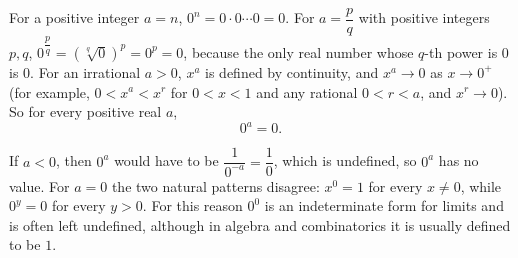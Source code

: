 For a positive integer $a=n$, $0^n=0\cdot0\cdots0=0$. For $a=\dfrac pq$ with positive integers $p,q$, $0^{\dfrac pq}=\left(\sqrt[q]{0}\right)^p=0^p=0$, because the only real number whose $q$-th power is $0$ is $0$. For an irrational $a>0$, $x^a$ is defined by continuity, and $x^a\to0$ as $x\to0^+$ (for example, $0<x^a<x^{r}$ for $0<x<1$ and any rational $0<r<a$, and $x^r\to0$). So for every positive real $a$,
\[0^a=\boxed{0}.\]

If $a<0$, then $0^a$ would have to be $\dfrac{1}{0^{-a}}=\dfrac10$, which is undefined, so $0^a$ has no value. For $a=0$ the two natural patterns disagree: $x^0=1$ for every $x\ne0$, while $0^y=0$ for every $y>0$. For this reason $0^0$ is an indeterminate form for limits and is often left undefined, although in algebra and combinatorics it is usually defined to be $1$.
